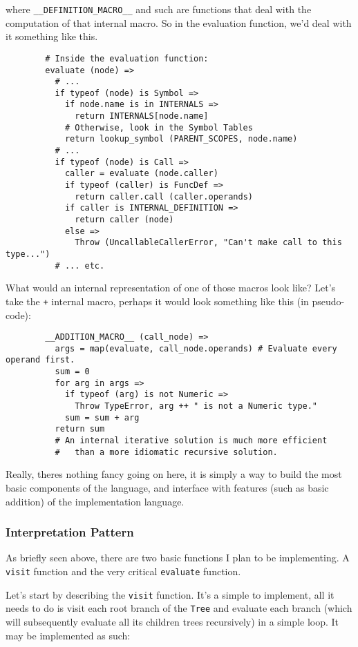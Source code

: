 \documentclass{article}
\newcommand{\code}[1]{\texttt{#1}}
\begin{document}
      where \code{\_\_DEFINITION\_MACRO\_\_} and such are functions that deal with
      the computation of that internal macro. So in the evaluation function,
      we'd deal with it something like this.
      \begin{verbatim}
        # Inside the evaluation function:
        evaluate (node) =>
          # ...
          if typeof (node) is Symbol =>
            if node.name is in INTERNALS =>
              return INTERNALS[node.name]
            # Otherwise, look in the Symbol Tables
            return lookup_symbol (PARENT_SCOPES, node.name)
          # ...
          if typeof (node) is Call =>
            caller = evaluate (node.caller)
            if typeof (caller) is FuncDef =>
              return caller.call (caller.operands)
            if caller is INTERNAL_DEFINITION =>
              return caller (node)
            else =>
              Throw (UncallableCallerError, "Can't make call to this type...")
          # ... etc.
      \end{verbatim}
      \clearpage
      What would an internal representation of one of those macros look like?
      Let's take the \code{+} internal macro, perhaps it would look something
      like this (in pseudo-code):
      \begin{verbatim}
        __ADDITION_MACRO__ (call_node) =>
          args = map(evaluate, call_node.operands) # Evaluate every operand first.
          sum = 0
          for arg in args =>
            if typeof (arg) is not Numeric =>
              Throw TypeError, arg ++ " is not a Numeric type."
            sum = sum + arg
          return sum
          # An internal iterative solution is much more efficient
          #   than a more idiomatic recursive solution.
      \end{verbatim}
      Really, theres nothing fancy going on here, it is simply a way to build
      the most basic components of the language, and interface with features
      (such as basic addition) of the implementation language.
    \subsubsection{Interpretation Pattern}
      As briefly seen above, there are two basic functions I plan to be
      implementing.  A \code{visit} function and the very critical \code{evaluate}
      function.

      Let's start by describing the \code{visit} function. It's a simple to
      implement, all it needs to do is visit each root branch of the \code{Tree}
      and evaluate each branch (which will subsequently evaluate all its children
      trees recursively) in a simple loop. It may be implemented as such:
\end{document}
